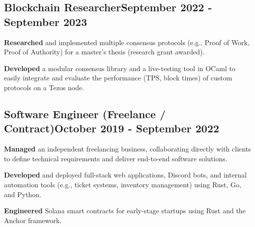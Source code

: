 \documentclass[a4paper,12pt]{article}
\begin{document}
\vspace*{1pt} 
\subsection{{Blockchain Researcher}\hfill September 2022 - September 2023}
\begin{zitemize}
    \item \textbf{Researched} and implemented multiple consensus protocols (e.g., Proof of Work, Proof of Authority) for a master's thesis (research grant awarded).
    \item \textbf{Developed} a modular consensus library and a live-testing tool in OCaml to easily integrate and evaluate the performance (TPS, block times) of custom protocols on a Tezos node.
\end{zitemize}

\vspace*{1pt} 
\subsection{{Software Engineer (Freelance / Contract)}\hfill October 2019 - September 2022}
\begin{zitemize}
  \item \textbf{Managed} an independent freelancing business, collaborating directly with clients to define technical requirements and deliver end-to-end software solutions.
  \item \textbf{Developed} and deployed full-stack web applications, Discord bots, and internal automation tools (e.g., ticket systems, inventory management) using Rust, Go, and Python.
  \item \textbf{Engineered} Solana smart contracts for early-stage startups using Rust and the Anchor framework.
\end{zitemize}
\end{document}

